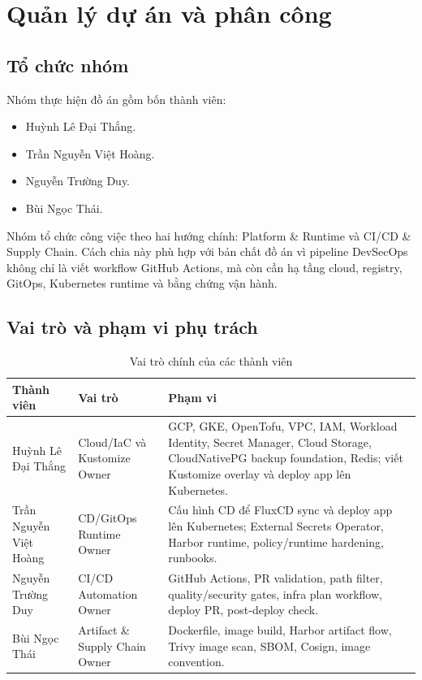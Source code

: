 \chapter{Quản lý dự án và phân công}
\label{chap:project-management}

\section{Tổ chức nhóm}

Nhóm thực hiện đồ án gồm bốn thành viên:

\begin{itemize}
  \item Huỳnh Lê Đại Thắng.
  \item Trần Nguyễn Việt Hoàng.
  \item Nguyễn Trường Duy.
  \item Bùi Ngọc Thái.
\end{itemize}

Nhóm tổ chức công việc theo hai hướng chính: Platform \& Runtime và CI/CD \& Supply Chain. Cách chia này phù hợp với bản chất đồ án vì pipeline DevSecOps không chỉ là viết workflow GitHub Actions, mà còn cần hạ tầng cloud, registry, GitOps, Kubernetes runtime và bằng chứng vận hành.

\section{Vai trò và phạm vi phụ trách}

\begin{table}[H]
\centering
\caption{Vai trò chính của các thành viên}
\label{tab:team-roles}
\begin{tabularx}{\textwidth}{|p{}|p{}|Y|}
\hline
\textbf{Thành viên} & \textbf{Vai trò} & \textbf{Phạm vi} \\
\hline
Huỳnh Lê Đại Thắng & Cloud/IaC và Kustomize Owner & GCP, GKE, OpenTofu, VPC, IAM, Workload Identity, Secret Manager, Cloud Storage, CloudNativePG backup foundation, Redis; viết Kustomize overlay và deploy app lên Kubernetes. \\
Trần Nguyễn Việt Hoàng & CD/GitOps Runtime Owner & Cấu hình CD để FluxCD sync và deploy app lên Kubernetes; External Secrets Operator, Harbor runtime, policy/runtime hardening, runbooks. \\
Nguyễn Trường Duy & CI/CD Automation Owner & GitHub Actions, PR validation, path filter, quality/security gates, infra plan workflow, deploy PR, post-deploy check. \\
Bùi Ngọc Thái & Artifact \& Supply Chain Owner & Dockerfile, image build, Harbor artifact flow, Trivy image scan, SBOM, Cosign, image convention. \\
\hline
\end{tabularx}
\end{table}

